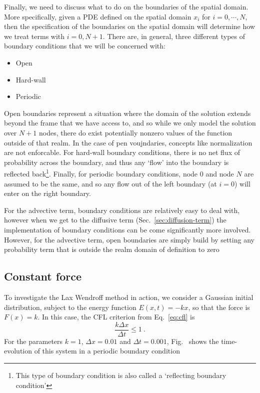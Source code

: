 \documentclass[15pt]{article}
\begin{document}
Finally, we need to discuss what to do on the boundaries of the spatial domain. More specifically, given a PDE defined on the spatial domain $x_i$ for $i=0, \cdots, N$, then the specification of the boundaries on the spatial domain will determine how we treat terms with $i=0, N+1$. There are, in general, three different types of boundary conditions that we will be concerned with:
\begin{itemize}
    \item{Open}
    \item{Hard-wall}
    \item{Periodic}
\end{itemize}
Open boundaries represent a situation where the domain of the solution extends beyond the frame that we have access to, and so while we only model the solution over $N+1$ nodes, there do exist potentially nonzero values of the function outside of that realm. In the case of pen voujndaries, concepts like normalization are not enforcable.  For hard-wall boundary conditions, there is no net flux of probability across the boundary, and thus any `flow' into the boundary is reflected back\footnote{This type of boundary condition is also called a `reflecting boundary condition'}. Finally, for periodic boundary conditions, node $0$ and node $N$ are assumed to be the same, and so any flow out of the left boundary (at $i=0$) will enter on the right boundary.

For the advective term, boundary conditions are relatively easy to deal with, however when we get to the diffusive term (Sec.~\ref{sec:diffusion-term}) the implementation of boundary conditions can be come significantly more involved.  However, for the advective term, open boundaries are simply build by setting any probability term that is outside the realm domain of definition to zero

\subsection{Constant force}

To investigate the Lax Wendroff method in action, we consider a Gaussian initial distribution, subject to the energy function $E(x, t) = -kx$, so that the force is $F(x) = k$. In this case, the CFL criterion from Eq.~\eqref{eq:cfl} is 
\begin{equation}
    \frac{k\Delta x}{\Delta t} \leq 1 \label{eq:cfl-const} \ .
\end{equation}
For the parameters $k = 1$, $\Delta x = 0.01$ and $\Delta t = 0.001$, Fig.~ shows the time-evolution of this system in a periodic boundary condition
\end{document}
